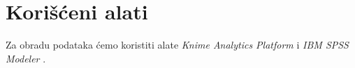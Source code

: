\section{Kori\v{s}\'c{}eni alati}
\label{sec:Alati}

Za obradu podataka \'c{}emo koristiti alate \emph{Knime Analytics Platform} \cite{KNIME} i \emph{IBM SPSS Modeler} \cite{SPSS}.
